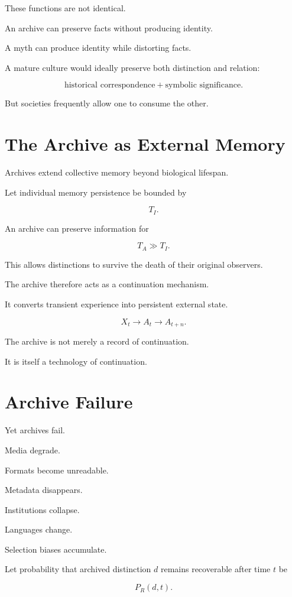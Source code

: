 \documentclass[11pt,oneside]{book}
\theoremstyle{definition}
\theoremstyle{remark}
\begin{document}
These functions are not identical.

An archive can preserve facts without producing identity.

A myth can produce identity while distorting facts.

A mature culture would ideally preserve both distinction and relation:

\[
\text{historical correspondence}
+
\text{symbolic significance}.
\]

But societies frequently allow one to consume the other.

\section{The Archive as External Memory}

Archives extend collective memory beyond biological lifespan.

Let individual memory persistence be bounded by

\[
T_I.
\]

An archive can preserve information for

\[
T_A\gg T_I.
\]

This allows distinctions to survive the death of their original observers.

The archive therefore acts as a continuation mechanism.

It converts transient experience into persistent external state.

\[
X_t
\rightarrow
A_t
\rightarrow
A_{t+n}.
\]

The archive is not merely a record of continuation.

It is itself a technology of continuation.

\section{Archive Failure}

Yet archives fail.

Media degrade.

Formats become unreadable.

Metadata disappears.

Institutions collapse.

Languages change.

Selection biases accumulate.

Let probability that archived distinction \(d\) remains recoverable after time \(t\) be

\[
P_R(d,t).
\]
\end{document}
